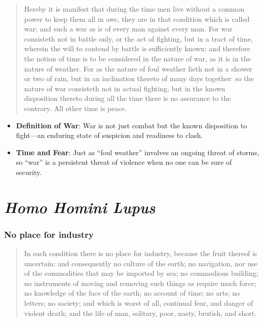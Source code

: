             \begin{quote}
                Hereby it is manifest that during the time men live without a common power to keep them all in awe, they are in that condition which is called war; and such a war as is of every man against every man. For war consisteth not in battle only, or the act of fighting, but in a tract of time, wherein the will to contend by battle is sufficiently known: and therefore the notion of time is to be considered in the nature of war, as it is in the nature of weather. For as the nature of foul weather lieth not in a shower or two of rain, but in an inclination thereto of many days together: so the nature of war consisteth not in actual fighting, but in the known disposition thereto during all the time there is no assurance to the contrary. All other time is peace.
            \end{quote}

            \begin{itemize}
                \item \textbf{Definition of War}: War is not just combat but the known disposition to fight—an enduring state of suspicion and readiness to clash.
                \item \textbf{Time and Fear}: Just as “foul weather” involves an ongoing threat of storms, so “war” is a persistent threat of violence when no one can be sure of security.
            \end{itemize}

\section{\textit{Homo Homini Lupus}}

        \subsubsection{No place for industry}

            \begin{quote}
                In such condition there is no place for industry, because the fruit thereof is uncertain: and consequently no culture of the earth; no navigation, nor use of the commodities that may be imported by sea; no commodious building; no instruments of moving and removing such things as require much force; no knowledge of the face of the earth; no account of time; no arts; no letters; no society; and which is worst of all, continual fear, and danger of violent death; and the life of man, solitary, poor, nasty, brutish, and short.
            \end{quote}

